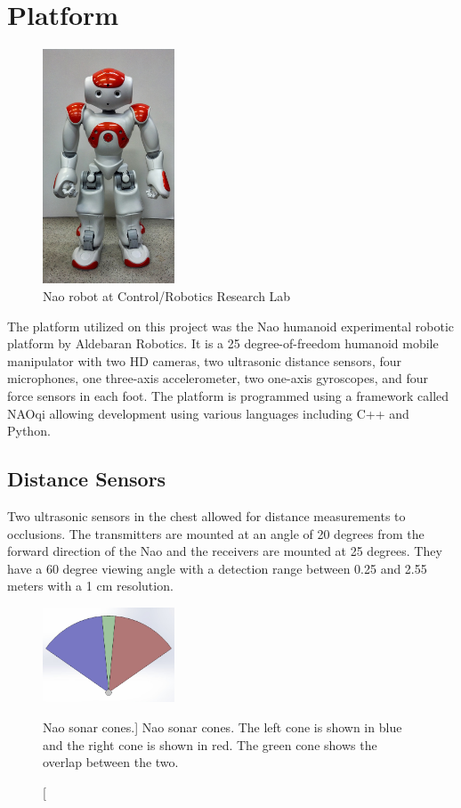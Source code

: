 \chapter{Platform}

\begin{figure}[H]
	\centering
	\includegraphics[width=0.35\textwidth]{nao1.jpg}
	\caption
	{Nao robot at Control/Robotics Research Lab}
	\label{fig:nao1}
\end{figure}

The platform utilized on this project was the Nao humanoid experimental robotic platform by Aldebaran Robotics. It is a 25 degree-of-freedom humanoid mobile manipulator with two HD cameras, two ultrasonic distance sensors, four microphones, one three-axis accelerometer, two one-axis gyroscopes, and four force sensors in each foot. The platform is programmed using a framework called NAOqi allowing development using various languages including C++ and Python. 

\section{Distance Sensors}
Two ultrasonic sensors in the chest allowed for distance measurements to occlusions. The transmitters are mounted at an angle of 20 degrees from the forward direction of the Nao and the receivers are mounted at 25 degrees. They have a 60 degree viewing angle with a detection range between 0.25 and 2.55 meters with a 1 cm resolution.

\begin{figure}[h]
	\centering
	\includegraphics[width=0.35\textwidth]{sonar1.jpg}
	\caption
	[Nao sonar cones.]
	{Nao sonar cones. The left cone is shown in blue and the right cone is shown in red. The green cone shows the overlap between the two.}
	\label{fig:sonar1}
\end{figure}

